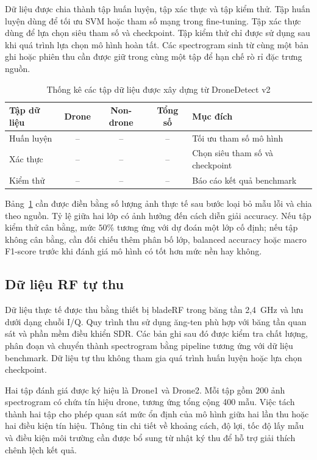 \documentclass[../DoAn.tex]{subfiles}
\begin{document}
Dữ liệu được chia thành tập huấn luyện, tập xác thực và tập kiểm thử. Tập huấn luyện dùng để tối ưu SVM hoặc tham số mạng trong fine-tuning. Tập xác thực dùng để lựa chọn siêu tham số và checkpoint. Tập kiểm thử chỉ được sử dụng sau khi quá trình lựa chọn mô hình hoàn tất. Các spectrogram sinh từ cùng một bản ghi hoặc phiên thu cần được giữ trong cùng một tập để hạn chế rò rỉ đặc trưng nguồn.

\begin{table}[H]
    \centering
    \caption{Thống kê các tập dữ liệu được xây dựng từ DroneDetect v2}
    \label{tab:dronedetect_statistics}
    \renewcommand{\arraystretch}{1.3}
    \begin{tabular}{|p{}|c|c|c|p{}|}
        \hline
        \textbf{Tập dữ liệu} & \textbf{Drone} & \textbf{Non-drone} & \textbf{Tổng số} & \textbf{Mục đích} \\ \hline
        Huấn luyện & -- & -- & -- & Tối ưu tham số mô hình \\ \hline
        Xác thực & -- & -- & -- & Chọn siêu tham số và checkpoint \\ \hline
        Kiểm thử & -- & -- & -- & Báo cáo kết quả benchmark \\ \hline
    \end{tabular}
\end{table}

Bảng~\ref{tab:dronedetect_statistics} cần được điền bằng số lượng ảnh thực tế sau bước loại bỏ mẫu lỗi và chia theo nguồn. Tỷ lệ giữa hai lớp có ảnh hưởng đến cách diễn giải accuracy. Nếu tập kiểm thử cân bằng, mức $50\%$ tương ứng với dự đoán một lớp cố định; nếu tập không cân bằng, cần đối chiếu thêm phân bố lớp, balanced accuracy hoặc macro F1-score trước khi đánh giá mô hình có tốt hơn mức nền hay không.

\subsection{Dữ liệu RF tự thu}

Dữ liệu thực tế được thu bằng thiết bị bladeRF trong băng tần 2,4~GHz và lưu dưới dạng chuỗi I/Q. Quy trình thu sử dụng ăng-ten phù hợp với băng tần quan sát và phần mềm điều khiển SDR. Các bản ghi sau đó được kiểm tra chất lượng, phân đoạn và chuyển thành spectrogram bằng pipeline tương ứng với dữ liệu benchmark. Dữ liệu tự thu không tham gia quá trình huấn luyện hoặc lựa chọn checkpoint.

Hai tập đánh giá được ký hiệu là Drone1 và Drone2. Mỗi tập gồm 200 ảnh spectrogram có chứa tín hiệu drone, tương ứng tổng cộng 400 mẫu. Việc tách thành hai tập cho phép quan sát mức ổn định của mô hình giữa hai lần thu hoặc hai điều kiện tín hiệu. Thông tin chi tiết về khoảng cách, độ lợi, tốc độ lấy mẫu và điều kiện môi trường cần được bổ sung từ nhật ký thu để hỗ trợ giải thích chênh lệch kết quả.
\end{document}
